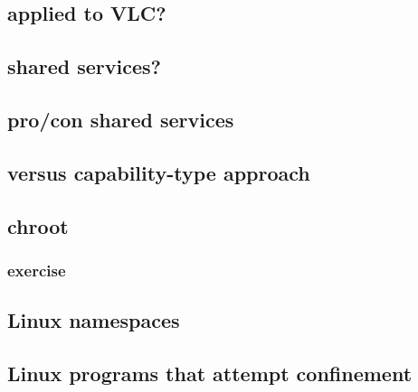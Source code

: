 \subsection{applied to VLC?}


\subsection{shared services?}


\subsection{pro/con shared services}



\subsection{versus capability-type approach}


\subsection{chroot}


\subsubsection{exercise}


\subsection{Linux namespaces}




\subsection{Linux programs that attempt confinement}


